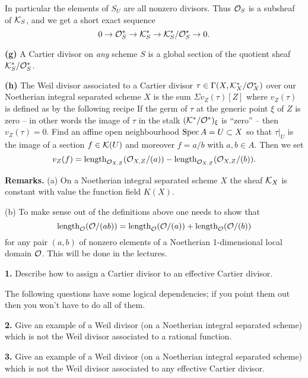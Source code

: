 In particular the elements of $S_U$ are all nonzero divisors.
Thus ${\cal O}_S$ is a subsheaf of ${\cal K}_S$, and we get a
short exact sequence
$$
0 \to {\cal O}_S^\ast \to {\cal K}_S^\ast \to
{\cal K}_S^\ast/{\cal O}_S^\ast \to 0.
$$
\item{\bf (g)} A Cartier divisor on {\it any} scheme $S$ is a global
section of the quotient sheaf ${\cal K}_S^\ast/{\cal O}_S^\ast$.
\item{\bf (h)} The Weil divisor associated to a Cartier divisor
$\tau \in \Gamma(X, {\cal K}_X^\ast/{\cal O}_X^\ast)$ over our 
Noetherian integral separated scheme
$X$ is the sum $\Sigma v_Z(\tau)[Z]$ where $v_Z(\tau)$ is defined
as by the following recipe
 If the germ of $\tau$ at the generic point $\xi$
of $Z$ is zero -- in other words the image of $\tau$ in the stalk
$({\cal K}^\ast/{\cal O}^\ast)_\xi$ is ``zero'' -- then $v_Z(\tau)=0$.
 Find an affine open neighbourhood $\mathop{\rm Spec} A = U \subset X$
so that $\tau|_U$ is the image of a section $f \in {\cal K}(U)$
and moreover $f = a/b$ with $a,b \in A$. Then we set
$$
v_Z(f)=\mathop{\rm length}\nolimits_{{\cal O}_{X,Z}}({\cal O}_{X,Z}/(a)) -
\mathop{\rm length}\nolimits_{{\cal O}_{X,Z}}({\cal O}_{X,Z}/(b)).
$$

\medskip\noindent
{\bf Remarks.} (a) On a Noetherian integral separated scheme $X$ the 
sheaf ${\cal K}_X$ is constant with value the function field $K(X)$.

\noindent (b) To make sense out of the definitions above one needs
to show that
$$
\mathop{\rm length}\nolimits_{\cal O}({\cal O}/(ab)) =
\mathop{\rm length}\nolimits_{\cal O}({\cal O}/(a)) +
\mathop{\rm length}\nolimits_{\cal O}({\cal O}/(b))
$$
for any pair $(a,b)$ of nonzero elements of a Noetherian 1-dimensional
local domain ${\cal O}$. This will be done in the lectures.

\goodbreak\bigskip\item{\bf 1.} Describe how to assign a Cartier divisor
to an effective Cartier divisor.

\medskip\noindent
The following questions have some logical dependencies; if you point them
out then you won't have to do all of them.

\medskip\item{\bf 2.} Give an example of a Weil divisor
(on a Noetherian integral separated scheme) which is not
the Weil divisor associated to a rational function.

\medskip\item{\bf 3.} Give an example of a Weil divisor
(on a Noetherian integral separated scheme) which is not
the Weil divisor associated to any effective Cartier divisor.

